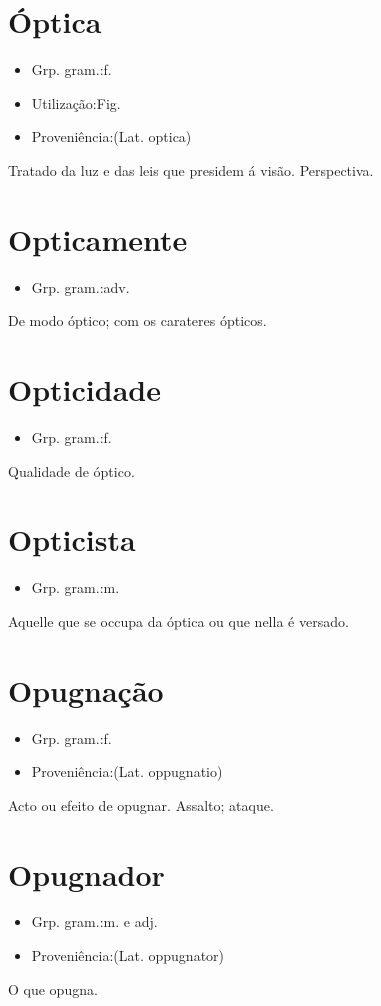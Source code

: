 \section{Óptica}
\begin{itemize}
\item {Grp. gram.:f.}
\end{itemize}
\begin{itemize}
\item {Utilização:Fig.}
\end{itemize}
\begin{itemize}
\item {Proveniência:(Lat. \textunderscore optica\textunderscore )}
\end{itemize}
Tratado da luz e das leis que presidem á visão.
Perspectiva.
\section{Opticamente}
\begin{itemize}
\item {Grp. gram.:adv.}
\end{itemize}
De modo óptico; com os carateres ópticos.
\section{Opticidade}
\begin{itemize}
\item {Grp. gram.:f.}
\end{itemize}
Qualidade de óptico.
\section{Opticista}
\begin{itemize}
\item {Grp. gram.:m.}
\end{itemize}
Aquelle que se occupa da óptica ou que nella é versado.
\section{Opugnação}
\begin{itemize}
\item {Grp. gram.:f.}
\end{itemize}
\begin{itemize}
\item {Proveniência:(Lat. \textunderscore oppugnatio\textunderscore )}
\end{itemize}
Acto ou efeito de opugnar.
Assalto; ataque.
\section{Opugnador}
\begin{itemize}
\item {Grp. gram.:m.  e  adj.}
\end{itemize}
\begin{itemize}
\item {Proveniência:(Lat. \textunderscore oppugnator\textunderscore )}
\end{itemize}
O que opugna.
